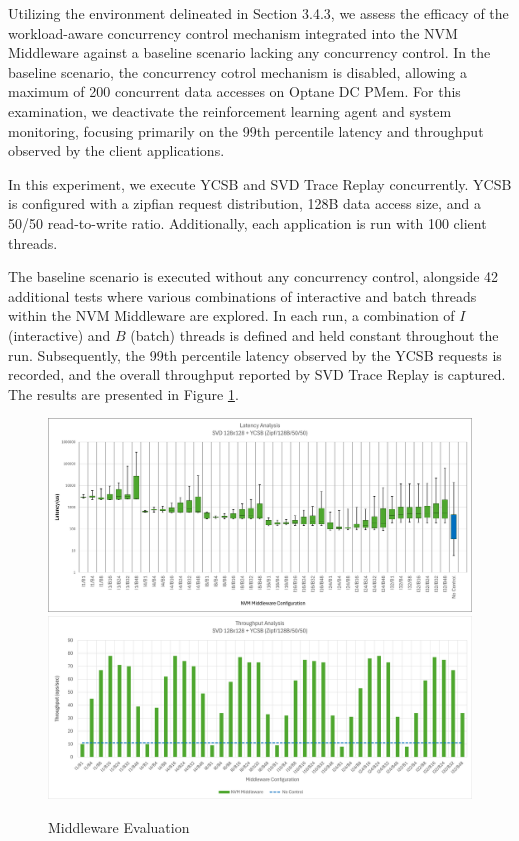 Utilizing the environment delineated in Section 3.4.3, we assess the efficacy of the workload-aware concurrency control mechanism integrated into the NVM Middleware against a baseline scenario lacking any concurrency control. In the baseline scenario, the concurrency cotrol mechanism is disabled, allowing a maximum of 200 concurrent data accesses on Optane DC PMem. For this examination, we deactivate the reinforcement learning agent and system monitoring, focusing primarily on the 99th percentile latency and throughput observed by the client applications.

In this experiment, we execute YCSB and SVD Trace Replay concurrently. YCSB is configured with a zipfian request distribution, 128B data access size, and a 50/50 read-to-write ratio. Additionally, each application is run with 100 client threads.

The baseline scenario is executed without any concurrency control, alongside 42 additional tests where various combinations of interactive and batch threads within the NVM Middleware are explored. In each run, a combination of $I$ (interactive) and $B$ (batch) threads is defined and held constant throughout the run. Subsequently, the 99th percentile latency observed by the YCSB requests is recorded, and the overall throughput reported by SVD Trace Replay is captured. The results are presented in Figure \ref{fig:middleware_eval}.

\begin{figure}[ht]
  \centering
  \includegraphics[width=\textwidth,height=\textheight,keepaspectratio,angle=0]{images/middleware-latency.png}
  \includegraphics[width=\textwidth,height=\textheight,keepaspectratio,angle=0]{images/middleware-tp.png}
  \caption{Middleware Evaluation}
  \label{fig:middleware_eval}
\end{figure}

